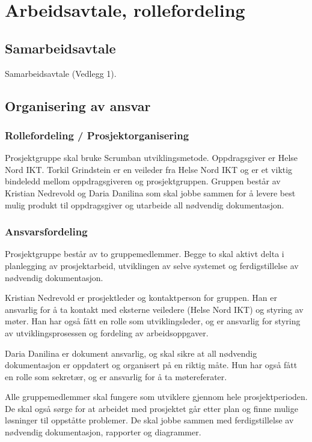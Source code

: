 \section{Arbeidsavtale, rollefordeling}

\subsection{Samarbeidsavtale}

Samarbeidsavtale (Vedlegg 1).

\subsection{Organisering av ansvar}

\subsubsection{Rollefordeling / Prosjektorganisering}

Prosjektgruppe skal bruke Scrumban utviklingsmetode. Oppdragsgiver er Helse Nord IKT. Torkil Grindstein er en veileder fra Helse Nord IKT og er et viktig bindeledd mellom oppdragsgiveren og prosjektgruppen. Gruppen består av Kristian Nedrevold og Daria Danilina som skal jobbe sammen for å levere best mulig produkt til oppdragsgiver og utarbeide all nødvendig dokumentasjon.

\subsubsection{Ansvarsfordeling}

Prosjektgruppe består av to gruppemedlemmer. Begge to skal aktivt delta i planlegging av prosjektarbeid, utviklingen av selve systemet og ferdigstillelse av nødvendig dokumentasjon.

Kristian Nedrevold er prosjektleder og kontaktperson for gruppen. Han er ansvarlig for å ta kontakt med eksterne veiledere (Helse Nord IKT) og styring av møter. Han har også fått en rolle som utviklingsleder, og er ansvarlig for styring av utviklingsprosessen og fordeling av arbeidsoppgaver.

Daria Danilina er dokument ansvarlig, og skal sikre at all nødvendig dokumentasjon er oppdatert og organisert på en riktig måte. Hun har også fått en rolle som sekretær, og er ansvarlig for å ta møtereferater.

Alle gruppemedlemmer skal fungere som utviklere gjennom hele prosjektperioden. De skal også sørge for at arbeidet med prosjektet går etter plan og finne mulige løsninger til oppståtte problemer. De skal jobbe sammen med ferdigstillelse av nødvendig dokumentasjon, rapporter og diagrammer.

